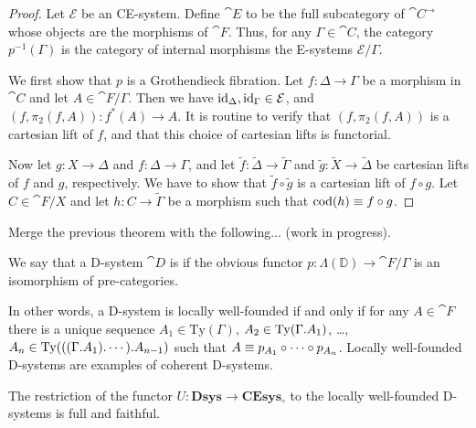 \begin{proof}
Let $\mathcal{E}$ be an CE-system. Define $\cat{E}$ to be the full subcategory
of $\cat{C}^\to$ whose objects are the morphisms of $\cat{F}$. Thus, for any
$\Gamma\in\cat{C}$, the category $p^{-1}(\Gamma)$ is the category of internal
morphisms the E-systems $\mathcal{E}/\Gamma$. 

We first show that $p$ is a Grothendieck fibration. Let $f:\Delta\to\Gamma$ be
a morphism in $\cat{C}$ and let $A\in\cat{F}/\Gamma$. Then we have ${\mathrm{id}_{\Delta}},{\mathrm{id}_{\Gamma}}\in\mathcal{E}$,
and $(f,\pi_2(f,A)):f^\ast(A)\to A$. It is routine to verify that $(f,\pi_2(f,A))$
is a cartesian lift of $f$, and that this choice of cartesian lifts is functorial. 

Now let $g:X\to\Delta$ and $f:\Delta\to \Gamma$, and let $\tilde{f}:\tilde{\Delta}\to\tilde{\Gamma}$ and
$\tilde{g}:\tilde{X}\to\tilde{\Delta}$ be cartesian lifts of $f$ and $g$, respectively. We have to show
that $\tilde{f}\circ \tilde{g}$ is a cartesian lift of $f\circ g$. Let $C\in\cat{F}/X$ and
let $h : C\to \tilde{\Gamma}$ be a morphism such that $\mathrm{cod}(h)\equiv f\circ g$. 
\end{proof}

Merge the previous theorem with the following... (work in progress).

\begin{defn}
We say that a D-system $\cat{D}$ is  if the obvious functor
$p:\Lambda(\mathbb{D})\to\cat{F}/\Gamma$ is an isomorphism of pre-categories.
\end{defn}

\begin{rmk}
In other words, a D-system is locally well-founded if and only if
for any $A\in\cat{F}$ there is a unique sequence
$A_1\in\mathrm{Ty}(\Gamma)$, $A_2\in\mathrm{Ty}(\ctxext{\Gamma}{A_1})$, \ldots,
$A_n\in\mathrm{Ty}(\ctxext{{{\Gamma}{A_1}}{\cdots}}{A_{n-1}})$ such that
$A\equiv p_{A_1}\circ\cdots\circ p_{A_n}$. Locally well-founded D-systems 
are examples of coherent D-systems.
\end{rmk}

\begin{thm}
The restriction of the functor $U:\mathbf{Dsys}\to\mathbf{CEsys_{\circ}}$ to the
locally well-founded D-systems is full and faithful.
\end{thm}

